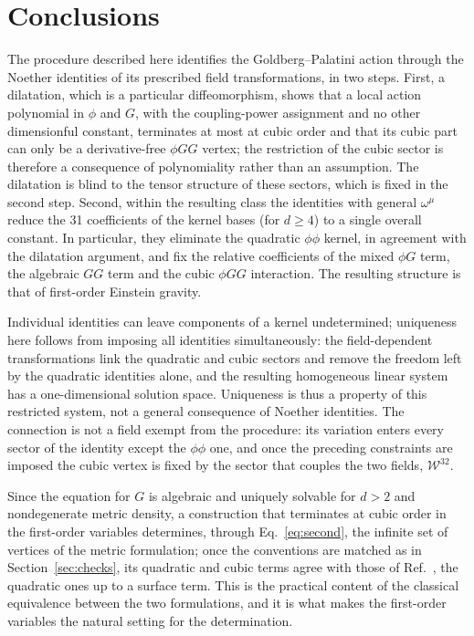 \documentclass[prd,aps,preprint,nofootinbib,amsmath,amssymb,eqsecnum]{revtex4-2}
\newcommand{\W}{\mathcal{W}}
\begin{document}
\section{Conclusions}
\label{sec:conclusions}

The procedure described here identifies the Goldberg--Palatini action through the
Noether identities of its prescribed field transformations, in two steps. First, a
dilatation, which is a particular diffeomorphism, shows that a local action polynomial in
$\phi$ and $G$, with the coupling-power assignment and no other dimensionful constant,
terminates at most at cubic order and that its cubic part can only be a derivative-free $\phi GG$
vertex; the restriction of the cubic sector is therefore a consequence of polynomiality
rather than an assumption. The dilatation is blind to the tensor structure of these sectors, which is fixed in the second step.
Second, within the resulting class the identities with general
$\omega^\mu$ reduce the 31 coefficients of the kernel bases (for $d\geq4$) to a single
overall constant. In particular, they eliminate the quadratic $\phi\phi$ kernel, in
agreement with the dilatation argument, and fix the relative coefficients of the mixed
$\phi G$ term, the algebraic $GG$ term and the cubic $\phi GG$ interaction. The resulting
structure is that of first-order Einstein gravity.

Individual identities can leave components of a kernel undetermined; uniqueness here follows
from imposing all identities simultaneously:
the field-dependent transformations link the quadratic and cubic sectors and remove the
freedom left by the quadratic identities alone, and the resulting homogeneous linear system
has a one-dimensional solution space. Uniqueness is thus a property of this restricted
system, not a general consequence of Noether identities. The connection is not a field
exempt from the procedure: its variation enters every sector of the identity except the
$\phi\phi$ one, and once the preceding constraints are imposed the cubic vertex is fixed by
the sector that couples the two fields, $\W^{32}$.

Since the equation for $G$ is algebraic and uniquely solvable for $d>2$ and nondegenerate
metric density, a construction that terminates at cubic order in the first-order variables
determines, through Eq.~\eqref{eq:second}, the infinite set of vertices of the metric
formulation; once the conventions are matched as in Section~\ref{sec:checks}, its quadratic
and cubic terms agree with those of Ref.~\cite{CLM1973}, the quadratic ones up to a surface
term. This is the practical content of the classical equivalence between the two
formulations, and it is what makes the first-order variables the natural setting for the
determination.
\end{document}
